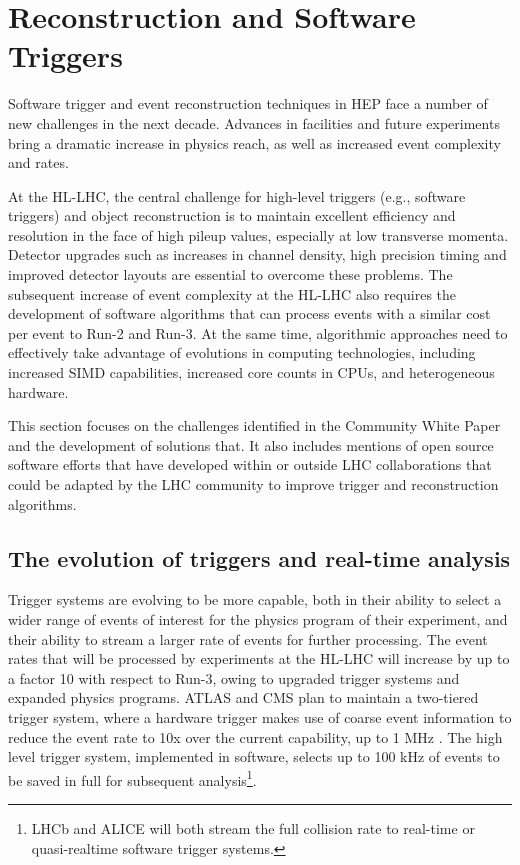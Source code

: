 \hypertarget{reconstruction-and-software-triggers}{%
\section{Reconstruction and Software
Triggers}\label{reconstruction-and-software-triggers}}

Software trigger and event reconstruction techniques in HEP face a
number of new challenges in the next decade. Advances in facilities and
future experiments bring a dramatic increase in physics reach, as well
as increased event complexity and rates.

At the HL-LHC, the central challenge for high-level triggers (e.g.,
software triggers) and object reconstruction is to maintain excellent
efficiency and resolution in the face of high pileup values, especially
at low transverse momenta. Detector upgrades such as increases in
channel density, high precision timing and improved detector layouts are
essential to overcome these problems. The subsequent increase of event
complexity at the HL-LHC also requires the development of software
algorithms that can process events with a similar cost per event to
Run-2 and Run-3. At the same time, algorithmic approaches need to
effectively take advantage of evolutions in computing technologies,
including increased SIMD capabilities, increased core counts in CPUs,
and heterogeneous hardware.

This section focuses on the challenges identified in the Community White
Paper~\cite{Alves:2017she,albrecht2018hepexec,albrecht2018hep} and the development of solutions that. It also includes
mentions of open source software efforts that have developed within or
outside LHC collaborations that could be adapted by the LHC community to
improve trigger and reconstruction algorithms.

\hypertarget{the-evolution-of-triggers-and-real-time-analysis}{%
\subsection{\texorpdfstring{The evolution of triggers and real-time
analysis
}{The evolution of triggers and real-time analysis }}\label{the-evolution-of-triggers-and-real-time-analysis}}

Trigger systems are evolving to be more capable, both in their ability
to select a wider range of events of interest for the physics program of
their experiment, and their ability to stream a larger rate of events
for further processing. The event rates that will be processed by
experiments at the HL-LHC will increase by up to a factor 10 with
respect to Run-3, owing to upgraded trigger systems and expanded physics
programs. ATLAS and CMS plan to maintain a two-tiered trigger system,
where a hardware trigger makes use of coarse event information to reduce
the event rate to 10x over the current capability, up to 1 MHz \cite{ATLAS-TDR-29,collaboration:2714892}. The high level trigger system, implemented in software, selects
up to 100 kHz of events to be saved in full for subsequent
analysis\footnote{LHCb \cite{Aaij:2019uij} and ALICE \cite{Buncic:2011297} will both
  stream the full collision rate to real-time or quasi-realtime software
  trigger systems.}.


